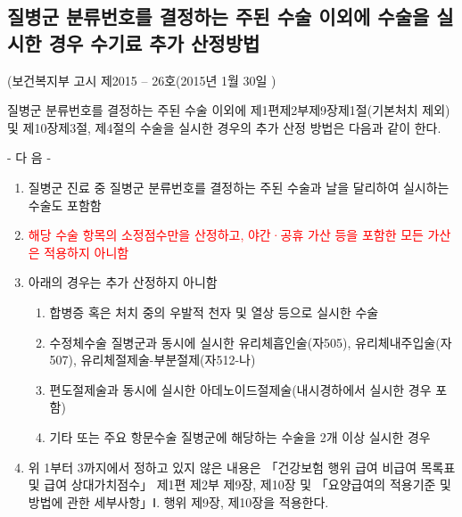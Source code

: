 \subsection{질병군 분류번호를 결정하는 주된 수술 이외에 수술을 실시한 경우 수기료 추가 산정방법}
(보건복지부 고시 제2015 – 26호(2015년 1월 30일 )\par
질병군 분류번호를 결정하는 주된 수술 이외에 제1편제2부제9장제1절(기본처치 제외) 및 제10장제3절, 제4절의 수술을 실시한 경우의 추가 산정 방법은 다음과 같이 한다.\par
- 다 음 -
\begin{enumerate}[1.]\tightlist
\item 질병군 진료 중 질병군 분류번호를 결정하는 주된 수술과 날을 달리하여 실시하는 수술도 포함함
\item \textcolor{red}{해당 수술 항목의 소정점수만을 산정하고, 야간·공휴 가산 등을 포함한 모든 가산은 적용하지 아니함}
\item 아래의 경우는 추가 산정하지 아니함
	\begin{enumerate}\tightlist
	\item 합병증 혹은 처치 중의 우발적 천자 및 열상 등으로 실시한 수술
	\item 수정체수술 질병군과 동시에 실시한 유리체흡인술(자505), 유리체내주입술(자507), 유리체절제술-부분절제(자512-나)
	\item 편도절제술과 동시에 실시한 아데노이드절제술(내시경하에서 실시한 경우 포함)
	\item 기타 또는 주요 항문수술 질병군에 해당하는 수술을 2개 이상 실시한 경우
	\end{enumerate}
\item  위 1부터 3까지에서 정하고 있지 않은 내용은 「건강보험 행위 급여\cntrdot{} 비급여 목록표 및 급여 상대가치점수」 제1편 제2부 제9장, 제10장 및 「요양급여의 적용기준 및 방법에 관한 세부사항」Ⅰ. 행위 제9장, 제10장을 적용한다.
\end{enumerate}

